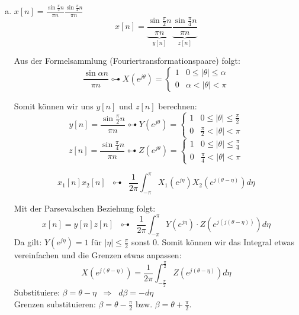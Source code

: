 \begin{uebsp}
\begin{Answer}
\begin{enumerate}[a)]
        \item $\displaystyle x[n]=\frac{\sin\frac{\pi}{2}n}{\pi
            n}\frac{\sin\frac{\pi}{4}n}{\pi n}$
            \[x[n]=\underbrace{\frac{\sin\frac{\pi}{2}n}{\pi
                n}}_{y[n]}\underbrace{\frac{\sin\frac{\pi}{4}n}{\pi n}}_{z[n]}\]
            \begin{uebsp_theory}
                Aus der Formelsammlung (Fouriertransformationspaare) folgt:
                \[\frac{\sin \alpha n}{\pi n}\multimapdotbothA
                X\left(e^{j\theta}\right)=\begin{cases}1&0\leq|\theta|\leq\alpha\\0&\alpha<|\theta|<\pi\end{cases}\]
            \end{uebsp_theory}
            Somit können wir uns $y[n]$ und $z[n]$ berechnen:
            \[y[n]=\frac{\sin \frac{\pi}{2} n}{\pi n}\multimapdotbothA
                Y\left(e^{j\theta}\right)=\begin{cases}1&0\leq|\theta|\leq\frac{\pi}{2}\\0&\frac{\pi}{2}<|\theta|<\pi\end{cases}\]
            \[z[n]=\frac{\sin \frac{\pi}{4} n}{\pi n}\multimapdotbothA
                Z\left(e^{j\theta}\right)=\begin{cases}1&0\leq|\theta|\leq\frac{\pi}{4}\\0&\frac{\pi}{4}<|\theta|<\pi\end{cases}\]
            \begin{definition}
                \[x_1[n]x_2[n]\;\;\multimapdotbothA\;\;\frac{1}{2\pi}\int_{-\pi}^{\pi}X_1\left(e^{j\eta}\right)X_2\left(e^{j(\theta-\eta)}\right)d\eta\]
            \end{definition}
            Mit der Parsevalschen Beziehung folgt:
            \[x[n]=y[n]z[n]\;\;\multimapdotbothA\;\;\frac{1}{2\pi}\int_{-\pi}^\pi
            Y\left(e^{j\eta}\right)\cdot
            Z\left(e^{j\left(j(\theta-\eta)\right)}\right)d\eta\]
            Da gilt: $Y\left(e^{j\eta}\right)=1$ für $|\eta|\leq\frac{\pi}{2}$
                sonst $0$. 
            Somit können wir das Integral etwas vereinfachen und die Grenzen
            etwas anpassen:
            \[X\left(e^{j(\theta-\eta)}\right)=\frac{1}{2\pi}\int_{-\frac{\pi}{2}}^{\frac{\pi}{2}} Z\left(e^{j(\theta-\eta)}\right)d\eta\]
            Substituiere: $\beta=\theta-\eta\;\;\Rightarrow\;\;d\beta=-d\eta$\\
            Grenzen substituieren: $\beta=\theta-\frac{\pi}{2}$ bzw.
            $\beta=\theta+\frac{\pi}{2}$.


\end{enumerate}
\end{Answer}
\end{uebsp}

